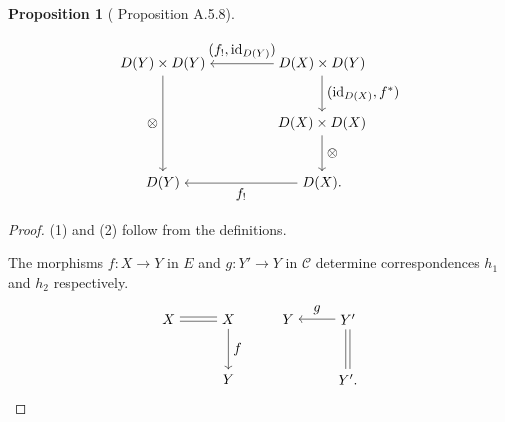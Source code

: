 \documentclass[a4paper,dvipdfmx,11pt,reqno]{amsart}
\DeclareMathOperator{\id}{id}
\newcommand{\C}{\mathcal{C}}
\theoremstyle{definition}
\newtheorem{proposition}[theorem]{Proposition}
\begin{document}
\begin{proposition}[\cite{Mann22} Proposition A.5.8]
\begin{enumerate}
    \[\begin{tikzpicture}[auto,->] 
      \node (tl) at (0,3) {$D(Y) \times D(Y)$}; 
      \node (tr) at (4,3) {$D(X) \times D(Y)$};
      \node (mr) at (4,1.5) {$D(X) \times D(X)$};
      \node (bl) at (0,0) {$D(Y)$}; 
      \node (br) at (4,0) {$D(X).$}; 
      \draw (tr) -- node[swap] {$(f_!,\id_{D(Y)})$} (tl); 
      \draw (br) -- node {$f_{!}$} (bl); 
      \draw (tl) -- node[swap] {$\otimes$} (bl);
      \draw (tr) -- node {$(\id_{D(X)},f^{*})$} (mr);
      \draw (mr) -- node {$\otimes$} (br); 
    \end{tikzpicture}\]
  \end{enumerate}
\end{proposition}

\begin{proof}
  (1) and (2) follow from the definitions.

  The morphisms $f : X \to Y$ in $E$ and $g : Y' \to Y$ in $\C$ determine correspondences $h_1$ and $h_2$ respectively.
  \[\begin{tikzpicture}[auto]
    \node (11) at (0,1.5) {$X$};
    \node (12) at (1.5,1.5) {$X$};
    \node (13) at (3,1.5) {$Y$};
    \node (14) at (4.5,1.5) {$Y'$};
    \node (22) at (1.5,0) {$Y$};
    \node (24) at (4.5,0) {$Y'.$};
    \draw[transform canvas={yshift=1.5pt}] (12) -- (11);
    \draw[transform canvas={yshift=-1.5pt}] (12) -- (11);   
    \draw[->] (14) -- node[swap] {$g$} (13);
    \draw[->] (12) -- node {$f$} (22);
    \draw[transform canvas={xshift=1.5pt}] (14) -- (24);
    \draw[transform canvas={xshift=-1.5pt}] (14) -- (24);
  \end{tikzpicture}\]


\end{proof}
\end{document}
